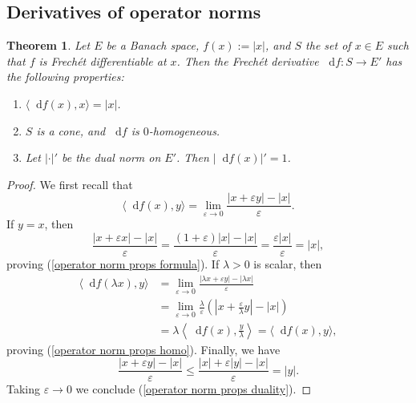 \documentclass[reqno,11pt]{amsart}
\newcommand*\dif{\mathop{}\!\mathrm{d}}
\newtheorem{theorem}{Theorem}[section]
\theoremstyle{definition}
\numberwithin{equation}{section}
\begin{document}
\subsection{Derivatives of operator norms}
\begin{theorem}
Let $E$ be a Banach space, $f(x) := |x|$, and $S$ the set of $x \in E$ such that $f$ is Frech\'et differentiable at $x$.
Then the Frech\'et derivative $\dif f: S \to E'$ has the following properties:
\begin{enumerate}
\item $\langle \dif f(x), x\rangle = |x|$. \label{operator norm props formula}
\item $S$ is a cone, and $\dif f$ is $0$-homogeneous. \label{operator norm props homo}
\item Let $|\cdot|'$ be the dual norm on $E'$. Then $|\dif f(x)|' = 1$. \label{operator norm props duality}
\end{enumerate}
\end{theorem}
\begin{proof}
We first recall that
$$\langle \dif f(x), y\rangle = \lim_{\varepsilon \to 0} \frac{|x + \varepsilon y| - |x|}{\varepsilon}.$$
If $y = x$, then
$$\frac{|x + \varepsilon x| - |x|}{\varepsilon} = \frac{(1 + \varepsilon)|x| - |x|}{\varepsilon} = \frac{\varepsilon |x|}{\varepsilon} = |x|,$$
proving (\ref{operator norm props formula}).
If $\lambda > 0$ is scalar, then
\begin{align*}
\langle \dif f(\lambda x), y\rangle
&= \lim_{\varepsilon \to 0} \frac{|\lambda x + \varepsilon y| - |\lambda x|}{\varepsilon} \\
&= \lim_{\varepsilon \to 0} \frac{\lambda}{\varepsilon} \left(\left|x + \frac{\varepsilon}{\lambda} y\right| - |x|\right) \\
&= \lambda \left\langle \dif f(x), \frac{y}{\lambda}\right\rangle = \langle \dif f(x), y\rangle,
\end{align*}
proving (\ref{operator norm props homo}).
Finally, we have 
$$\frac{|x + \varepsilon y| - |x|}{\varepsilon} \leq \frac{|x| + \varepsilon |y| - |x|}{\varepsilon} = |y|.$$
Taking $\varepsilon \to 0$ we conclude (\ref{operator norm props duality}).
\end{proof}
\end{document}
